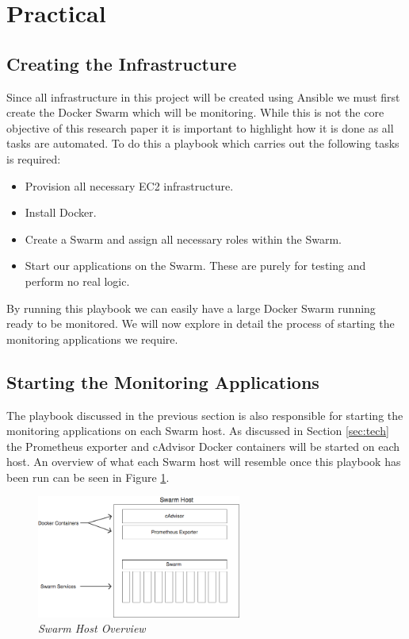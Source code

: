 \section{Practical}
\label{sec:practical}

\subsection{Creating the Infrastructure}
Since all infrastructure in this project will be created using Ansible we must first create the Docker Swarm which will be monitoring. While this is not the core objective of this research paper it is important to highlight how it is done as all tasks are automated. To do this a playbook which carries out the following tasks is required: 

\begin{itemize}
	\item Provision all necessary EC2 infrastructure.
	\item Install Docker.
	\item Create a Swarm and assign all necessary roles within the Swarm.
	\item Start our applications on the Swarm. These are purely for testing and perform no real logic.
\end{itemize}

By running this playbook we can easily have a large Docker Swarm running ready to be monitored. We will now explore in detail the process of starting the monitoring applications we require.

\subsection{Starting the Monitoring Applications}

The playbook discussed in the previous section is also responsible for starting the monitoring applications on each Swarm host. As discussed in Section \ref{sec:tech} the Prometheus exporter and cAdvisor Docker containers will be started on each host. An overview of what each Swarm host will resemble once this playbook has been run can be seen in Figure \ref{fig:swarm-hosts}.

\begin{figure}[!h]
\centering
\includegraphics*[width=0.6\textwidth]{components/images/swarm-hosts}
\caption{\em Swarm Host Overview}
\label{fig:swarm-hosts}
\end{figure}

